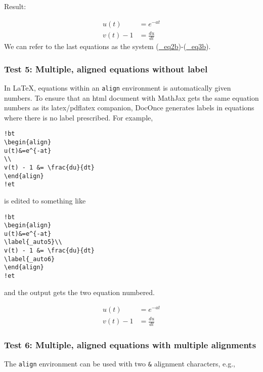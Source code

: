 \documentclass[]{article}
\begin{document}
Result:

\[
\begin{align}
u(t)&=e^{-at}
\label{_eq2b}\\ 
v(t) - 1 &= \frac{du}{dt}
\label{_eq3b}
\end{align}
\] We can refer to the last equations as the system
(\protect\hyperlink{_eq2b}{\_eq2b})-(\protect\hyperlink{_eq3b}{\_eq3b}).

\subsubsection{Test 5: Multiple, aligned equations without
label}\label{test-5-multiple-aligned-equations-without-label}

In LaTeX, equations within an \texttt{align} environment is
automatically given numbers. To ensure that an html document with
MathJax gets the same equation numbers as its latex/pdflatex companion,
DocOnce generates labels in equations where there is no label
prescribed. For example,

\begin{verbatim}
!bt
\begin{align}
u(t)&=e^{-at}
\\ 
v(t) - 1 &= \frac{du}{dt}
\end{align}
!et
\end{verbatim}

is edited to something like

\begin{verbatim}
!bt
\begin{align}
u(t)&=e^{-at}
\label{_auto5}\\ 
v(t) - 1 &= \frac{du}{dt}
\label{_auto6}
\end{align}
!et
\end{verbatim}

and the output gets the two equation numbered.

\[
\begin{align}
u(t)&=e^{-at}\\ 
v(t) - 1 &= \frac{du}{dt}
\end{align}
\]

\subsubsection{Test 6: Multiple, aligned equations with multiple
alignments}\label{test-6-multiple-aligned-equations-with-multiple-alignments}

The \texttt{align} environment can be used with two \texttt{\&}
alignment characters, e.g.,
\end{document}
